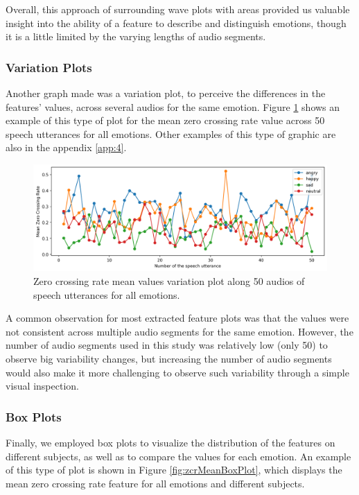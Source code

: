 Overall, this approach of surrounding wave plots with areas provided us valuable insight into the ability of a feature to describe and distinguish emotions, though it is a little limited by the varying lengths of audio segments.

\subsubsection{Variation Plots}

Another graph made was a variation plot, to perceive the differences in the features' values, across several audios for the same emotion. Figure \ref{fig:zcrMeanVar} shows an example of this type of plot for the mean zero crossing rate value across 50 speech utterances for all emotions. Other examples of this type of graphic are also in the appendix \ref{app:4}.

\begin{figure}[H]
	\centering
	\includegraphics[width=\linewidth]{figs/4_1_traditional/meanZCRVar.png}
	\caption{Zero crossing rate mean values variation plot along 50 audios of speech utterances for all emotions.}
	\label{fig:zcrMeanVar}
\end{figure}

A common observation for most extracted feature plots was that the values were not consistent across multiple audio segments for the same emotion. However, the number of audio segments used in this study was relatively low (only 50) to observe big variability changes, but increasing the number of audio segments would also make it more challenging to observe such variability through a simple visual inspection.

\subsubsection{Box Plots}

Finally, we employed box plots to visualize the distribution of the features on different subjects, as well as to compare the values for each emotion. An example of this type of plot is shown in Figure \ref{fig:zcrMeanBoxPlot}, which displays the mean zero crossing rate feature for all emotions and different subjects. 

